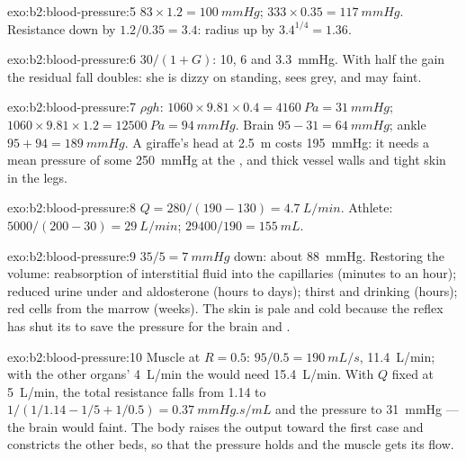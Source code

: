 \begin{solution}{exo:b2:blood-pressure:5}
$83\times 1.2 = \qty{100}{mmHg}$; $333\times 0.35 = \qty{117}{mmHg}$.
Resistance down by $1.2/0.35 = 3.4$: radius up by $3.4^{1/4} =
1.36$.
\end{solution}

\begin{solution}{exo:b2:blood-pressure:6}
$30/(1 + G)$: 10, 6 and \qty{3.3}{mmHg}. With half the gain the
residual fall doubles: she is dizzy on standing, sees grey, and may
faint.
\end{solution}

\begin{solution}{exo:b2:blood-pressure:7}
$\rho g h$: $1060\times 9.81\times 0.4 = \qty{4160}{Pa} =
\qty{31}{mmHg}$; $1060\times 9.81\times 1.2 = \qty{12500}{Pa} =
\qty{94}{mmHg}$. Brain $95 - 31 = \qty{64}{mmHg}$; ankle $95 + 94 =
\qty{189}{mmHg}$. A giraffe's head at \qty{2.5}{m} costs
\qty{195}{mmHg}: it needs a mean pressure of some \qty{250}{mmHg} at
the , and thick vessel walls and tight skin in the legs.
\end{solution}

\begin{solution}{exo:b2:blood-pressure:8}
$Q = 280/(190 - 130) = \qty{4.7}{L/min}$. Athlete: $5000/(200 - 30) =
\qty{29}{L/min}$;  $\num{29400}/190 = \qty{155}{mL}$.
\end{solution}

\begin{solution}{exo:b2:blood-pressure:9}
$35/5 = \qty{7}{mmHg}$ down: about \qty{88}{mmHg}. Restoring the
volume: reabsorption of interstitial fluid into the capillaries
(minutes to an hour); reduced urine under  and
aldosterone (hours to days); thirst and drinking (hours); red cells
from the marrow (weeks). The skin is pale and cold because the
reflex has shut its  to save the pressure for the brain
and .
\end{solution}

\begin{solution}{exo:b2:blood-pressure:10}
Muscle at $R = 0.5$: $95/0.5 = \qty{190}{mL/s}$, \qty{11.4}{L/min};
with the other organs' \qty{4}{L/min} the  would need
\qty{15.4}{L/min}. With $Q$ fixed at \qty{5}{L/min}, the total
resistance falls from 1.14 to $1/(1/1.14 - 1/5 + 1/0.5) =
\qty{0.37}{mmHg.s/mL}$ and the pressure to \qty{31}{mmHg} --- the
brain would faint. The body raises the output toward the first case
and constricts the other beds, so that the pressure holds and the
muscle gets its flow.
\end{solution}

